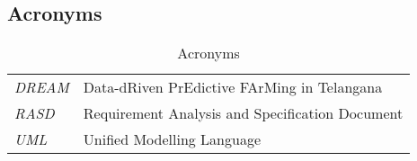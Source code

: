 \subsection{Acronyms}

\begin{center}
\renewcommand{\arraystretch}{2}
\begin{longtable}{|m{1.5cm}|m{8.6cm}|}
\caption{Acronyms}\\
\hline
\endfirsthead
\endhead
\hline
\endlastfoot
\hline
\textit{DREAM} & Data-dRiven PrEdictive FArMing in Telangana\\
\textit{RASD} & Requirement Analysis and Specification Document\\ 
\textit{UML} & Unified Modelling Language\\
\hline
\end{longtable}
\end{center}